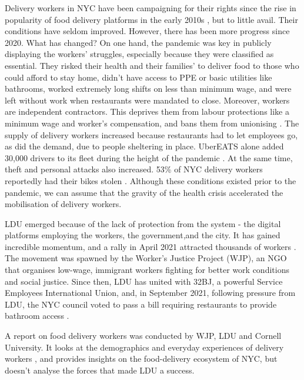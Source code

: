 \documentclass{article}[12pt]
\begin{document}
Delivery workers in NYC have been campaigning for their rights since the rise in popularity of food delivery platforms in the early 2010s \parencite{nytimes2014apps}, but to little avail. Their conditions have seldom improved. However, there has been more progress since 2020. What has changed? On one hand, the pandemic was key in publicly displaying the workers’ struggles, especially because they were classified as essential. 
They risked their health and their families’ to deliver food to those who could afford to stay home, didn't have access to PPE or basic utilities like bathrooms, worked extremely long shifts on less than minimum wage, and were left without work when restaurants were mandated to close. 
Moreover, workers are independent contractors. This deprives them from labour protections like a minimum wage and worker’s compensation, and bans them from unionising \parencite{dunn2019hustle}.
The supply of delivery workers increased because restaurants had to let employees go, as did the demand, due to people sheltering in place. UberEATS alone added 30,000 drivers to its fleet during the height of the pandemic \parencite{ldu_report2021}. At the same time,  theft and personal attacks also increased. 53\% of NYC delivery workers reportedly had their bikes stolen \parencite{brictv}.
Although these conditions existed prior to the pandemic, we can assume that the gravity of the health crisis accelerated the mobilisation of delivery workers.

LDU emerged because of the lack of protection from the system \parencite{lee2018delivering} - the digital platforms employing the workers, the government,and the city. It has gained incredible momentum, and a rally in April 2021 attracted thousands of workers \parencite{aponte_2021}. The movement was spawned by the Worker’s Justice Project (WJP), an NGO that organises low-wage, immigrant workers fighting for better work conditions and social justice. 
Since then, LDU has united with 32BJ, a powerful Service Employees International Union, and, in September 2021, following pressure from LDU, the NYC council voted to pass a bill requiring restaurants to provide bathroom access \parencite{vice2021bathroom}.

A report on food delivery workers was conducted by WJP, LDU and Cornell University. It looks at the demographics and everyday experiences of delivery workers \parencite{ldu_report2021}, and provides insights on the food-delivery ecosystem of NYC, but doesn’t analyse the forces that made LDU a success.
\end{document}
